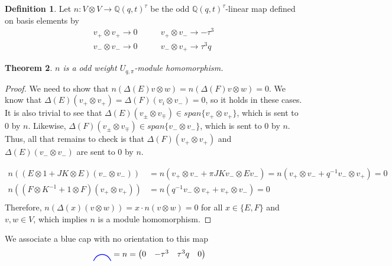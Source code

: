 \documentclass{amsart}
\newcommand{\hackcenter}[1]{
 \xy (0,0)*{#1}; \endxy}
\def\Q{\mathsf{Q}}
\theoremstyle{plain}
\newtheorem{theorem}{Theorem}
\theoremstyle{definition}
\newtheorem{definition}[theorem]{Definition}
\theoremstyle{definition}
\numberwithin{equation}{section}
\numberwithin{theorem}{section}
\renewcommand{\to}{\rightarrow}
\def\Q{\mathbb{Q}}
\numberwithin{equation}{section}
\begin{document}
\begin{definition}
 Let $n:V\otimes V \to \Q(q,t)^{\tau}$ be the odd $\Q(q,t)^\tau$-linear map defined on basis elements by
  \begin{align*}
    v_+\otimes v_+ \to 0 & \qquad v_+ \otimes v_- \to -\tau^3 \\
    v_- \otimes v_- \to 0 & \qquad v_- \otimes v_+ \to \tau^3 q
  \end{align*}
\end{definition}

\begin{theorem}
  $n$ is a odd weight $U_{q,\pi}$-module homomorphism.
\end{theorem}
\begin{proof}
  We need to show that $n(\Delta(E)v\otimes w)=n(\Delta(F)v\otimes w)=0$.
  We know that $\Delta(E)(v_+ \otimes v_+)=\Delta(F)(v_i \otimes v_-)=0$, so it holds in these cases.
  It is also trivial to see that $\Delta(E)(v_{\pm}\otimes v_{\mp}) \in span\{v_+ \otimes v_+\}$, which is sent to $0$ by $n$.
  Likewise, $\Delta(F)(v_{\pm}\otimes v_{\mp})\in span\{v_-\otimes v_-\}$, which is sent to $0$ by $n$.
  Thus, all that remains to check is that $\Delta(F)(v_+ \otimes v_+)$ and $\Delta(E)(v_-\otimes v_-)$ are sent to $0$ by $n$.

  \begin{align*}
    n((E\otimes 1 + JK \otimes E)(v_- \otimes v_-)) &= n(v_+ \otimes v_- +\pi JKv_-\otimes Ev_-)= n(v_+\otimes v_- + q^{-1}v_-\otimes v_+)=0 \\
    n((F\otimes K^{-1} + 1\otimes F)(v_+ \otimes v_+))&=n(q^{-1}v_- \otimes v_+ + v_+ \otimes v_-)=0\\
  \end{align*}
  Therefore, $n(\Delta(x)(v\otimes w))=x\cdot n(v\otimes w) = 0$ for all $x\in \{E,F\}$ and $v,w \in V$, which implies $n$ is a module homomorphism.
\end{proof}

We associate a blue cap with no orientation to this map
\begin{align}\label{n-draw}
  \hackcenter{ \begin{tikzpicture} [scale=.75]
\draw[thick,   blue, -] (0,0).. controls ++(.25,.5) and ++(-.25,.5).. (1,0);
\end{tikzpicture}} & = n =
\begin{pmatrix}
     0 & -\tau^3 & \tau^3q & 0
  \end{pmatrix}
\end{align}
\end{document}
